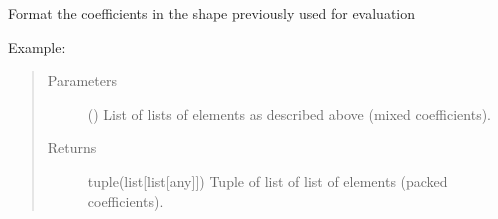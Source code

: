 \documentclass[letterpaper,10pt,english]{sphinxmanual}
\begin{document}
\begin{fulllineitems}
\label{\detokenize{coefficients_shapes:mermin_on_qiskit.coefficients_shapes.coefficients_format_mixed_to_packed}}
Format the coefficients in the shape previously used for evaluation
\begin{description}
\item[{Example:}] \leavevmode
\begin{sphinxVerbatim}[commandchars=\\\{\}]
\PYG{p}{[}\PYG{p}{[}  \PYG{p}{]} \PYG{p}{[}  \PYG{p}{]} \PYG{p}{[}  \PYG{p}{]} \PYG{p}{[}  \PYG{p}{]}\PYG{p}{]}                   
\end{sphinxVerbatim}

\end{description}
\begin{quote}\begin{description}
\item[{Parameters}] \leavevmode
{} (\sphinxstyleliteralemphasis{\sphinxupquote{{[}}}\sphinxstyleliteralemphasis{\sphinxupquote{{[}}}\sphinxstyleliteralemphasis{\sphinxupquote{{]}}}\sphinxstyleliteralemphasis{\sphinxupquote{{]}}}) \textendash{} List of lists of elements as 
described above (mixed coefficients).

\item[{Returns}] \leavevmode
tuple(list{[}list{[}any{]}{]}) \textendash{} Tuple of list of list of elements (packed
coefficients).

\end{description}\end{quote}

\end{fulllineitems}
\end{document}

